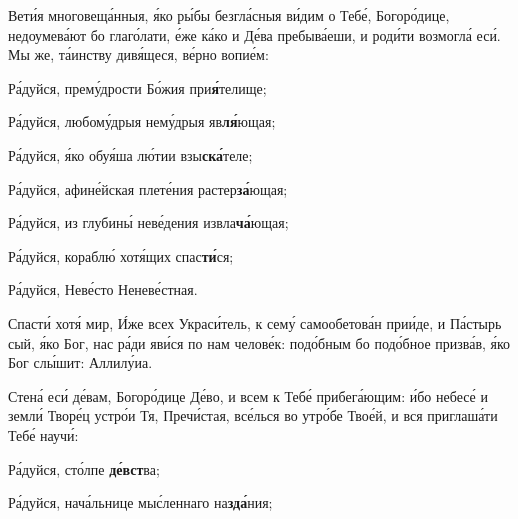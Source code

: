\begin{russian}


  \Ierei Вети́я многовеща́нныя, я́ко ры́бы безгла́сныя ви́дим о Тебе́, Богоро́дице, недоумева́ют бо глаго́лати, е́же ка́ко и Де́ва пребыва́еши, и роди́ти возмогла́ еси́. Мы же, та́инству дивя́щеся, ве́рно вопие́м:

  Ра́дуйся, прему́дрости Бо́жия при\textbf{я́}телище;


  Ра́дуйся, любому́дрыя нему́дрыя яв\textbf{ля́}ющая;


  Ра́дуйся, я́ко обуя́ша лю́тии взы\textbf{ска́}теле;


  Ра́дуйся, афине́йская плете́ния растер\textbf{за́}ющая;


  Ра́дуйся, из глубины́ неве́дения извла\textbf{ча́}ющая;


  Ра́дуйся, кораблю́ хотя́щих спас\textbf{ти́}ся;


  Ра́дуйся, Неве́сто Неневе́стная.


  \Ierei Спасти́ хотя́ мир, И́же всех Украси́тель, к сему́ самообетова́н прии́де, и Па́стырь сый, я́ко Бог, нас ра́ди яви́ся по нам челове́к: подо́бным бо подо́бное призва́в, я́ко Бог слы́шит: Аллилу́иа.


  \Ierei Стена́ еси́ де́вам, Богоро́дице Де́во, и всем к Тебе́ прибега́ющим: и́бо небесе́ и земли́ Творе́ц устро́и Тя, Пречи́стая, все́лься во утро́бе Твое́й, и вся приглаша́ти Тебе́ научи́:

  Ра́дуйся, сто́лпе \textbf{де́вст}ва;


  Ра́дуйся, нача́льнице мыс́леннаго на\textbf{зда́}ния;



\end{russian}
